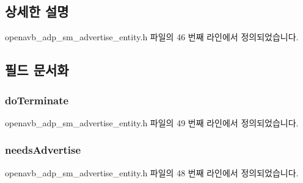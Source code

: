 \subsection{상세한 설명}


openavb\+\_\+adp\+\_\+sm\+\_\+advertise\+\_\+entity.\+h 파일의 46 번째 라인에서 정의되었습니다.



\subsection{필드 문서화}
\subsubsection[{\texorpdfstring{do\+Terminate}{doTerminate}}]{ do\+Terminate}\hypertarget{structopenavb__adp__sm__advertise__entity__vars__t_a5fc548cdb095393450f28eab966a626f}{}\label{structopenavb__adp__sm__advertise__entity__vars__t_a5fc548cdb095393450f28eab966a626f}


openavb\+\_\+adp\+\_\+sm\+\_\+advertise\+\_\+entity.\+h 파일의 49 번째 라인에서 정의되었습니다.

\subsubsection[{\texorpdfstring{needs\+Advertise}{needsAdvertise}}]{ needs\+Advertise}\hypertarget{structopenavb__adp__sm__advertise__entity__vars__t_a611772ff7133678dce5edb7324e0be58}{}\label{structopenavb__adp__sm__advertise__entity__vars__t_a611772ff7133678dce5edb7324e0be58}


openavb\+\_\+adp\+\_\+sm\+\_\+advertise\+\_\+entity.\+h 파일의 48 번째 라인에서 정의되었습니다.

